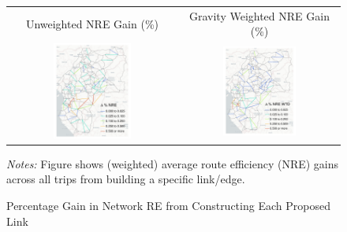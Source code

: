 \documentclass[a4paper]{article}
\begin{document}
\begin{figure}[h!] %
\centering
\caption{\label{fig:NRE_DA_TAN} Percentage Gain in Network RE from Constructing Each Proposed Link}
\vspace{2mm}
\begin{tabular}{cc}
Unweighted NRE Gain (\%) & Gravity Weighted NRE Gain (\%) \\ %
\includegraphics[width=0.48\textwidth]{"../figures/PE/trans_CEMAC_network_NRE_gain_perc.pdf"} &
\includegraphics[width=0.48\textwidth]{"../figures/PE/trans_CEMAC_network_NRE_wtd_gain_perc.pdf"} \\ [-0.2em]
\end{tabular}
\scriptsize 
\emph{Notes:} Figure shows (weighted) average route efficiency (NRE) gains across all trips from building a specific link/edge. 
\end{figure}
\end{document}
